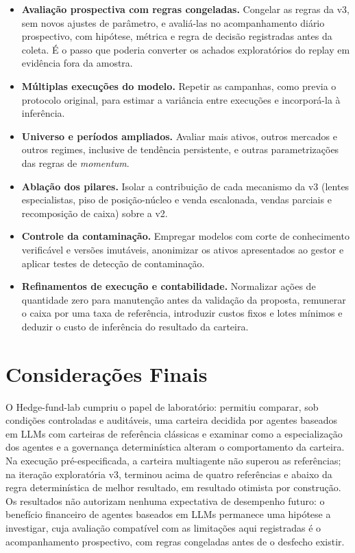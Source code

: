 \documentclass{eic-bcc-tcc}
\begin{document}
\begin{itemize}
    \item \textbf{Avaliação prospectiva com regras congeladas.} Congelar as regras da v3, sem novos ajustes de parâmetro, e avaliá-las no acompanhamento diário prospectivo, com hipótese, métrica e regra de decisão registradas antes da coleta. É o passo que poderia converter os achados exploratórios do replay em evidência fora da amostra.
    \item \textbf{Múltiplas execuções do modelo.} Repetir as campanhas, como previa o protocolo original, para estimar a variância entre execuções e incorporá-la à inferência.
    \item \textbf{Universo e períodos ampliados.} Avaliar mais ativos, outros mercados e outros regimes, inclusive de tendência persistente, e outras parametrizações das regras de \textit{momentum}.
    \item \textbf{Ablação dos pilares.} Isolar a contribuição de cada mecanismo da v3 (lentes especialistas, piso de posição-núcleo e venda escalonada, vendas parciais e recomposição de caixa) sobre a v2.
    \item \textbf{Controle da contaminação.} Empregar modelos com corte de conhecimento verificável e versões imutáveis, anonimizar os ativos apresentados ao gestor e aplicar testes de detecção de contaminação.
    \item \textbf{Refinamentos de execução e contabilidade.} Normalizar ações de quantidade zero para manutenção antes da validação da proposta, remunerar o caixa por uma taxa de referência, introduzir custos fixos e lotes mínimos e deduzir o custo de inferência do resultado da carteira.
\end{itemize}

\section{Considerações Finais}

O Hedge-fund-lab cumpriu o papel de laboratório: permitiu comparar, sob condições controladas e auditáveis, uma carteira decidida por agentes baseados em LLMs com carteiras de referência clássicas e examinar como a especialização dos agentes e a governança determinística alteram o comportamento da carteira. Na execução pré-especificada, a carteira multiagente não superou as referências; na iteração exploratória v3, terminou acima de quatro referências e abaixo da regra determinística de melhor resultado, em resultado otimista por construção. Os resultados não autorizam nenhuma expectativa de desempenho futuro: o benefício financeiro de agentes baseados em LLMs permanece uma hipótese a investigar, cuja avaliação compatível com as limitações aqui registradas é o acompanhamento prospectivo, com regras congeladas antes de o desfecho existir.

\backmatter

\end{document}
